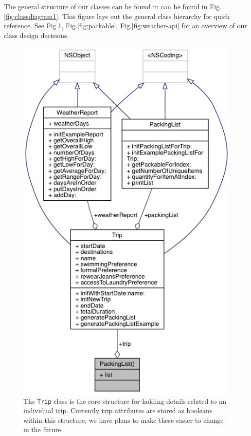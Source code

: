\documentclass[11pt]{article}
\begin{document}
    The general structure of our classes can be found in can be found in Fig.\ref{fig:classdiagram1}. This figure lays out the general class hierarchy for quick reference. See Fig.\ref{fig:tripclass}, Fig.\ref{fig:packable}, Fig.\ref{fig:weather-api} for an overview of our class design decisions. 

    \begin{figure}
        \centering
        \includegraphics[scale=0.75]{img/trip_inheritance.png}
        \caption{The \texttt{Trip} class is the core structure for holding details related to an individual trip. Currently trip attributes are stored as booleans within this structure; we have plans to make these easier to change in the future.}
        \label{fig:tripclass}
    \end{figure}
\end{document}
